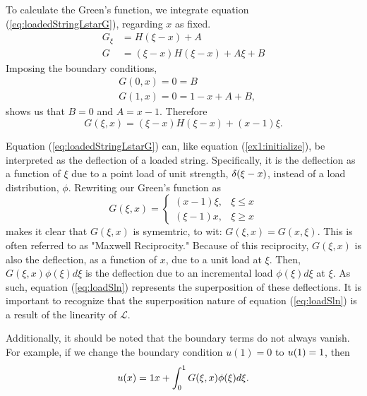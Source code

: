     To calculate the Green's function, we integrate equation (\ref{eq:loadedStringLstarG}), regarding \(x\) as fixed.
    \begin{equation}
        \begin{split}
            G_\xi &= H(\xi-x) + A\\
            G &= (\xi - x)H(\xi-x)+A\xi +B
        \end{split}
    \end{equation}
    Imposing the boundary conditions, 
    \begin{equation}
        \begin{split}
            &G(0,x) = 0 = B\\
            &G(1,x) = 0 =  1 - x + A + B,
        \end{split}
    \end{equation}
    shows us that \(B=0\) and  \(A=x-1\). Therefore
    \begin{equation}
        G(\xi,x) = (\xi-x)H(\xi-x) + (x-1)\xi.
    \end{equation}

    Equation (\ref{eq:loadedStringLstarG}) can, like equation (\ref{ex1:initialize}), be interpreted as the deflection of a loaded string. Specifically, it is the deflection as a function of \(\xi\) due to a point load of unit strength, \(\delta(\xi-x)\), instead of a load distribution, \(\phi\). Rewriting our Green's function as
    \begin{equation}
        G(\xi,x)= \begin{cases}
            (x-1)\xi, & \xi \leq x\\
            (\xi-1)x, & \xi \geq x
        \end{cases}
    \end{equation}
    makes it clear that \(G(\xi,x)\) is symemtric, to wit: \(G(\xi,x)=G(x,\xi)\). This is often referred to as "Maxwell Reciprocity." Because of this reciprocity, \(G(\xi,x)\) is also the deflection, as a function of \(x\), due to a unit load at \(\xi\). Then, \(G(\xi,x)\phi(\xi)d\xi\) is the deflection due to an incremental load \(\phi(\xi)d\xi\) at \(\xi\). As such, equation (\ref{eq:loadSln}) represents the superposition of these deflections. It is important to recognize that the superposition nature of equation (\ref{eq:loadSln}) is a result of the linearity of \(\mathcal{L}\).

    Additionally, it should be noted that the boundary terms do not always vanish. For example, if we change the boundary condition \(u(1)=0\) to \(u(1)=1\), then
    \begin{equation*}
        u(x)=1 x + \int_{0}^{1} G(\xi,x)\phi(\xi)d\xi.
    \end{equation*}

